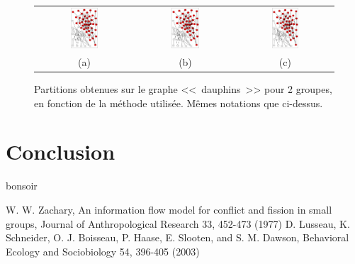 \documentclass[12pt]{article}
\begin{document}
\begin{figure}[bth]
	\begin{center}
		\begin{tabular}[h]{ccc}
		\includegraphics[width=0.30\textwidth]{do-m2-2}&
		\includegraphics[width=0.30\textwidth]{do-m2-2}&
		\includegraphics[width=0.30\textwidth]{do-m1-2-sp}
		\vspace{-5mm}
		\\
		(a) & (b) & (c)
		\end{tabular}
	\end{center}
	\caption{Partitions obtenues sur le graphe <<~dauphins~>> pour 2 groupes, en fonction de la méthode utilisée. Mêmes notations que
	ci-dessus.}
	\label{fig:partitions}
\end{figure}

\section{Conclusion}
bonsoir

\clearpage
\begin{thebibliography}{2}
 W. W. Zachary, An information flow model for conflict and fission in small groups, Journal of Anthropological Research 33, 452-473 (1977)
 D. Lusseau, K. Schneider, O. J. Boisseau, P. Haase, E. Slooten, and S. M. Dawson, Behavioral Ecology and Sociobiology 54, 396-405 (2003)
\end{thebibliography}
\end{document}
